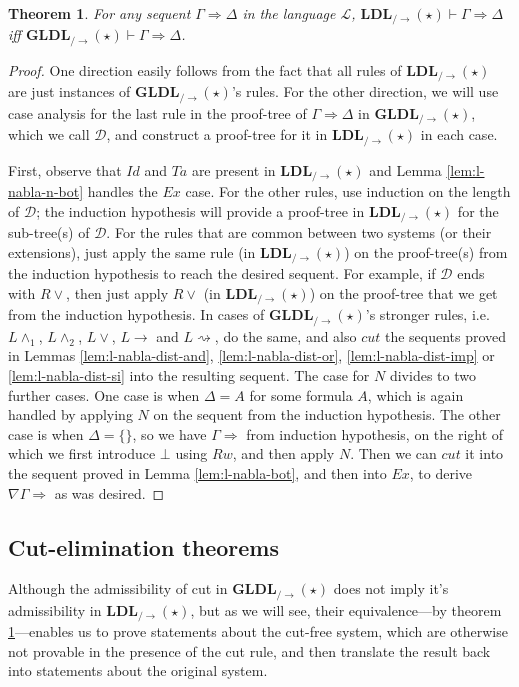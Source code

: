 \documentclass[12pt,a4paper]{article}
\theoremstyle{plain}
\newtheorem{thm}{Theorem}[section]
\theoremstyle{definition}
\begin{document}
\begin{thm}\label{thm:ldl-eq-ldls}
	For any sequent $\Gamma \Rightarrow \Delta$ in the language $\mathcal{L}$, $\mathbf{LDL}_{/\rightarrow}(\star) \vdash \Gamma \Rightarrow \Delta$ iff $\mathbf{GLDL}_{/\rightarrow}(\star) \vdash \Gamma \Rightarrow \Delta$.
\end{thm}
\begin{proof}
	One direction easily follows from the fact that all rules of $\mathbf{LDL}_{/\rightarrow}(\star)$ are just instances of $\mathbf{GLDL}_{/\rightarrow}(\star)$'s rules.
	For the other direction, we will use case analysis for the last rule in the proof-tree of $\Gamma \Rightarrow \Delta$ in $\mathbf{GLDL}_{/\rightarrow}(\star)$, which we call $\mathcal{D}$, and construct a proof-tree for it in $\mathbf{LDL}_{/\rightarrow}(\star)$ in each case.
	
	First, observe that $Id$ and $Ta$ are present in $\mathbf{LDL}_{/\rightarrow}(\star)$ and Lemma \ref{lem:l-nabla-n-bot} handles the $Ex$ case.
	For the other rules, use induction on the length of $\mathcal{D}$; the induction hypothesis will provide a proof-tree in $\mathbf{LDL}_{/\rightarrow}(\star)$ for the sub-tree(s) of $\mathcal{D}$.
	For the rules that are common between two systems (or their extensions), just apply the same rule (in $\mathbf{LDL}_{/\rightarrow}(\star)$) on the proof-tree(s) from the induction hypothesis to reach the desired sequent. For example, if $\mathcal{D}$ ends with $R\vee$, then just apply $R\vee$ (in $\mathbf{LDL}_{/\rightarrow}(\star)$) on the proof-tree that we get from the induction hypothesis.
	In cases of $\mathbf{GLDL}_{/\rightarrow}(\star)$'s stronger rules, i.e. $L\land_1$, $L\land_2$, $L\lor$, $L\rightarrow$ and $L\rightsquigarrow$, do the same, and also $cut$ the sequents proved in Lemmas \ref{lem:l-nabla-dist-and}, \ref{lem:l-nabla-dist-or}, \ref{lem:l-nabla-dist-imp} or \ref{lem:l-nabla-dist-si} into the resulting sequent.
	The case for $N$ divides to two further cases. One case is when $\Delta = A$ for some formula $A$, which is again handled by applying $N$ on the sequent from the induction hypothesis.
	The other case is when $\Delta = \{\}$, so we have $\Gamma \Rightarrow$ from induction hypothesis, on the right of which we first introduce $\bot$ using $Rw$, and then apply $N$.
	Then we can $cut$ it into the sequent proved in Lemma \ref{lem:l-nabla-bot}, and then into $Ex$, to derive $\nabla \Gamma \Rightarrow$ as was desired.
\end{proof}

\subsection{Cut-elimination theorems}
Although the admissibility of cut in $\mathbf{GLDL}_{/\rightarrow}(\star)$ does not imply it's admissibility in $\mathbf{LDL}_{/\rightarrow}(\star)$, but as we will see, their equivalence---by theorem \ref{thm:ldl-eq-ldls}---enables us to prove statements about the cut-free system, which are otherwise not provable in the presence of the cut rule, and then translate the result back into statements about the original system.
\end{document}
